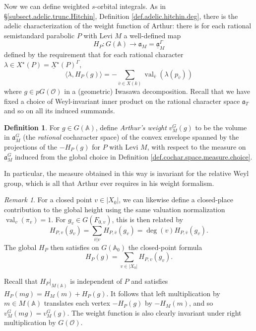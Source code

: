 \documentclass[openany]{amsbook}
\theoremstyle{definition}
\newtheorem{definition}[theorem]{Definition}
\theoremstyle{remark}
\newtheorem{remark}[theorem]{Remark}
\numberwithin{equation}{section}
\renewcommand{\O}{\mathcal{O}}
\newcommand{\A}{\mathbb{A}}
\newcommand{\ol}[1]{\overline{#1}}
\newcommand{\ul}[1]{\underline{#1}}
\newcommand{\val}{\on{val}}
\renewcommand{\-}{\operatorname{-}}
\renewcommand{\a}{\mathfrak{a}}
\newcommand{\on}[1]{\operatorname{#1}}
\renewcommand{\A}{\mathbb{A}}
\begin{document}
Now we can define weighted $s$-orbital integrals. As in \S \ref{subsect.adelic.trunc.Hitchin}, Definition \ref{def.adelic.hitchin.deg}, there is the adelic characterization of the weight function of Arthur: there is for each rational semistandard parabolic $P$ with Levi $M$ a well-defined map 
$$
    H_P : G(\A) \to \a_M = \ul{\a}_M^\Gamma
$$
defined by the requirement that for each rational character $\lambda \in X^\star(P) = \ul{X}^\star(P)^\Gamma$,
$$
    \langle \lambda, H_P(g)\rangle = -\sum_{\ol{v} \in X(k)} \val_{\ol{v}}(\lambda(p_{\ol{v}}))
$$
where $g \in pG(\O)$ in a (geometric) Iwasawa decomposition. Recall that we have fixed a choice of Weyl-invariant inner product on the rational character space $\a_T$ and so on all its induced summands. 
\begin{definition}\label{def.arthur.wt.ftn}
    For $g \in G(\A)$, define \emph{Arthur's weight} $v_M^G(g)$ to be the volume in $\a_M^G$ (the \emph{rational} cocharacter space) of the convex envelope spanned by the projections of the $-H_P(g)$ for $P$ with Levi $M$, with respect to the measure on $\a_M^G$ induced from the global choice in Definition \ref{def.cochar.space.measure.choice}.
\end{definition}
In particular, the measure obtained in this way is invariant for the relative Weyl group, which is all that Arthur ever requires in his weight formalism.

\begin{remark}
    For a closed point $v \in |X_0|$, we can likewise define a closed-place contribution to the global height using the same valuation normalization $\val_v(\pi_v) = 1$. For $g_v \in G(F_{0,v})$, this is then related by
    $$
        H_{P,v}(g_v) = \sum_{\ol{v}|v} H_{P,\ol{v}}(g_v) = \deg(v) H_{P, \ol{v}}(g_v).
    $$
    The global $H_P$ then satisfies on $G(\A_0)$ the closed-point formula 
    $$
        H_P(g) = \sum_{v \in |X_0|} H_{P,v}(g_v).
    $$
\end{remark}

Recall that $H_P|_{M(\A)}$ is independent of $P$ and satisfies $H_P(mg) = H_M(m) + H_P(g)$. It follows that left multiplication by $m \in M(\A)$ translates each vertex $-H_P(g)$ by $-H_M(m)$, and so $v_M^G(mg) = v_M^G(g)$. The weight function is also clearly invariant under right multiplication by $G(\O)$. 
\end{document}
